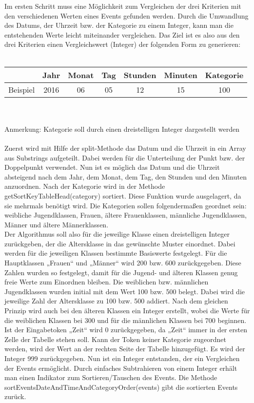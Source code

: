 {Im ersten Schritt muss eine Möglichkeit zum Vergleichen der drei Kriterien mit den verschiedenen Werten eines Events gefunden werden. Durch die Umwandlung des Datums, der Uhrzeit bzw. der Kategorie zu einem Integer, kann man die entstehenden Werte leicht miteinander vergleichen. Das Ziel ist es also aus den drei Kriterien einen Vergleichswert (Integer) der folgenden Form zu generieren: \\
\\
\begin{tabular}{|l||c|c|c|c|c|c|}
\hline
 & Jahr & Monat & Tag & Stunden & Minuten & Kategorie \\
\hline
Beispiel & 2016 & 06 & 05 & 12 & 15 & 100 \\
\hline
\end{tabular} \\
\\
Anmerkung: Kategorie soll durch einen dreistelligen Integer dargestellt werden\\
\\
Zuerst wird mit Hilfe der split-Methode das Datum und die Uhrzeit in ein Array aus Substrings aufgeteilt. Dabei werden für die Unterteilung der Punkt bzw. der Doppelpunkt verwendet. Nun ist es möglich das Datum und die Uhrzeit absteigend nach dem Jahr, dem Monat, dem Tag, den Stunden und den Minuten anzuordnen. 
Nach der Kategorie wird in der Methode getSortKeyTableHead(category) sortiert. Diese Funktion wurde ausgelagert, da sie mehrmals benötigt wird. Die Kategorien sollen folgendermaßen geordnet sein: \\
weibliche Jugendklassen, Frauen, ältere Frauenklassen, männliche Jugendklassen, Männer und ältere Männerklassen. \\
Der Algorithmus soll also für die jeweilige Klasse einen dreistelligen Integer zurückgeben, der die Altersklasse in das gewünschte Muster einordnet. Dabei werden für die jeweiligen Klassen bestimmte Basiswerte festgelegt. Für die Hauptklassen „Frauen“ und „Männer“ wird 200 bzw. 600 zurückgegeben. Diese Zahlen wurden so festgelegt, damit für die Jugend- und älteren Klassen genug freie Werte zum Einordnen bleiben. Die weiblichen bzw. männlichen Jugendklassen wurden initial mit dem Wert 100 bzw. 500 belegt. Dabei wird die jeweilige Zahl der Altersklasse zu 100 bzw. 500 addiert. Nach dem gleichen Prinzip wird auch bei den älteren Klassen ein Integer erstellt, wobei die Werte für die weiblichen Klassen bei 300 und für die männlichen Klassen bei 700 beginnen. Ist der Eingabetoken „Zeit“ wird 0 zurückgegeben, da „Zeit“ immer in der ersten Zelle der Tabelle stehen soll. Kann der Token keiner Kategorie zugeordnet werden, wird der Wert an der rechten Seite der Tabelle hinzugefügt. Es wird der Integer 999 zurückgegeben.
Nun ist ein Integer entstanden, der ein Vergleichen der Events ermöglicht. Durch einfaches Subtrahieren von einem Integer erhält man einen Indikator zum Sortieren/Tauschen des Events. Die Methode sortEventsDateAndTimeAndCategoryOrder(events) gibt die sortierten Events zurück.

}
